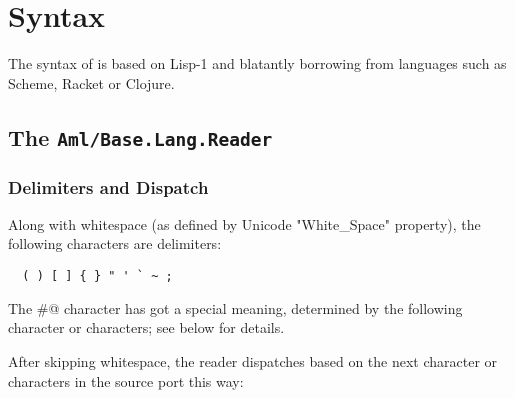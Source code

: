 
\chapter{Syntax}
\label{ch:aml-base-syntax}

The syntax of \AmlBase is based on Lisp-1 and blatantly borrowing from languages such as Scheme, Racket or Clojure.




\section[The Aml/Base.Lang.Reader]{The \lstinline!Aml/Base.Lang.Reader!}
\label{sec:aml-base-lang-reader}




\subsection{Delimiters and Dispatch}

Along with whitespace (as defined by Unicode "White\_Space" property), the following characters are delimiters:

\begin{lstlisting}
  ( ) [ ] { } " ' ` ~ ;
\end{lstlisting}

The \lstinline@#@ character has got a special meaning, determined by the following character or characters; see below for details. 

After skipping whitespace, the \AmlBase reader dispatches based on the next character or characters in the source port this way:

